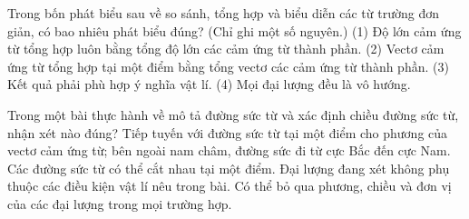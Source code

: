 \begin{ex}
Trong bốn phát biểu sau về so sánh, tổng hợp và biểu diễn các từ trường đơn giản, có bao nhiêu phát biểu đúng? (Chỉ ghi một số nguyên.) (1) Độ lớn cảm ứng từ tổng hợp luôn bằng tổng độ lớn các cảm ứng từ thành phần. (2) Vectơ cảm ứng từ tổng hợp tại một điểm bằng tổng vectơ các cảm ứng từ thành phần. (3) Kết quả phải phù hợp ý nghĩa vật lí. (4) Mọi đại lượng đều là vô hướng.
\end{ex}

\begin{ex}
Trong một bài thực hành về mô tả đường sức từ và xác định chiều đường sức từ, nhận xét nào đúng?
\choice
{\True Tiếp tuyến với đường sức từ tại một điểm cho phương của vectơ cảm ứng từ; bên ngoài nam châm, đường sức đi từ cực Bắc đến cực Nam.}
{Các đường sức từ có thể cắt nhau tại một điểm.}
{Đại lượng đang xét không phụ thuộc các điều kiện vật lí nêu trong bài.}
{Có thể bỏ qua phương, chiều và đơn vị của các đại lượng trong mọi trường hợp.}
\end{ex}

